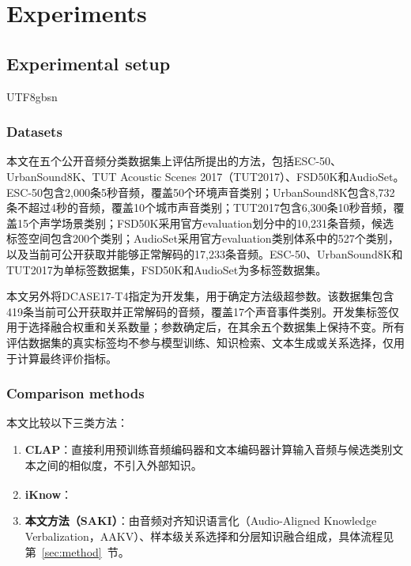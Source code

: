 \providecommand{\nextrevision}[1]{#1}
\section{Experiments}\label{sec:experiments}
\subsection{Experimental setup}\label{sec:setup}
\begin{CJK*}{UTF8}{gbsn}

\subsubsection{Datasets}\label{sec:datasets}

本文在五个公开音频分类数据集上评估所提出的方法，包括ESC-50、UrbanSound8K、TUT Acoustic Scenes 2017（TUT2017）、FSD50K和AudioSet。ESC-50包含2,000条5秒音频，覆盖50个环境声音类别；UrbanSound8K包含8,732条不超过4秒的音频，覆盖10个城市声音类别；TUT2017包含6,300条10秒音频，覆盖15个声学场景类别；FSD50K采用官方evaluation划分中的10,231条音频，候选标签空间包含200个类别；AudioSet采用官方evaluation类别体系中的527个类别，以及当前可公开获取并能够正常解码的17,233条音频。ESC-50、UrbanSound8K和TUT2017为单标签数据集，FSD50K和AudioSet为多标签数据集。

本文另外将DCASE17-T4指定为开发集，用于确定方法级超参数。该数据集包含419条当前可公开获取并正常解码的音频，覆盖17个声音事件类别。开发集标签仅用于选择融合权重和关系数量；参数确定后，在其余五个数据集上保持不变。所有评估数据集的真实标签均不参与模型训练、知识检索、文本生成或关系选择，仅用于计算最终评价指标。

\subsubsection{Comparison methods}\label{sec:comparison-methods}

本文比较以下三类方法：

\begin{enumerate}
    \item \textbf{CLAP}：直接利用预训练音频编码器和文本编码器计算输入音频与候选类别文本之间的相似度，不引入外部知识。
    \item \textbf{iKnow\textsuperscript{\dag}}：
    \item \nextrevision{\textbf{本文方法（SAKI）}：由音频对齐知识语言化（Audio-Aligned Knowledge Verbalization，AAKV）、样本级关系选择和分层知识融合组成，具体流程见第~\ref{sec:method}~节。}
\end{enumerate}


\end{CJK*}
